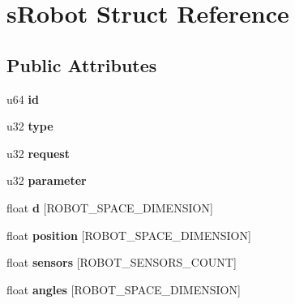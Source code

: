 \hypertarget{structsRobot}{\section{s\-Robot Struct Reference}
\label{structsRobot}
}
\subsection*{Public Attributes}
\begin{DoxyCompactItemize}
\item 
\hypertarget{structsRobot_acf6d1a5a8d9024cbe6efcd5c5b421916}{u64 {\bfseries id}}\label{structsRobot_acf6d1a5a8d9024cbe6efcd5c5b421916}

\item 
\hypertarget{structsRobot_afc0670f677fc59982378f53f3cecefe4}{u32 {\bfseries type}}\label{structsRobot_afc0670f677fc59982378f53f3cecefe4}

\item 
\hypertarget{structsRobot_ab6f3d5c45c246e0d8b46a31cf94338a3}{u32 {\bfseries request}}\label{structsRobot_ab6f3d5c45c246e0d8b46a31cf94338a3}

\item 
\hypertarget{structsRobot_ac1c416ef8f2316726f3b835fb06f2474}{u32 {\bfseries parameter}}\label{structsRobot_ac1c416ef8f2316726f3b835fb06f2474}

\item 
\hypertarget{structsRobot_adb204dd2d289ebab8178309ae815ac47}{float {\bfseries d} \mbox{[}R\-O\-B\-O\-T\-\_\-\-S\-P\-A\-C\-E\-\_\-\-D\-I\-M\-E\-N\-S\-I\-O\-N\mbox{]}}\label{structsRobot_adb204dd2d289ebab8178309ae815ac47}

\item 
\hypertarget{structsRobot_a723c6e8327be50f8f7edf5894f11fba2}{float {\bfseries position} \mbox{[}R\-O\-B\-O\-T\-\_\-\-S\-P\-A\-C\-E\-\_\-\-D\-I\-M\-E\-N\-S\-I\-O\-N\mbox{]}}\label{structsRobot_a723c6e8327be50f8f7edf5894f11fba2}

\item 
\hypertarget{structsRobot_a044ce4ac3802a9f99da743b7d85556ab}{float {\bfseries sensors} \mbox{[}R\-O\-B\-O\-T\-\_\-\-S\-E\-N\-S\-O\-R\-S\-\_\-\-C\-O\-U\-N\-T\mbox{]}}\label{structsRobot_a044ce4ac3802a9f99da743b7d85556ab}

\item 
\hypertarget{structsRobot_a7ef86a7202a493cdf4aa3ada4ba6bb73}{float {\bfseries angles} \mbox{[}R\-O\-B\-O\-T\-\_\-\-S\-P\-A\-C\-E\-\_\-\-D\-I\-M\-E\-N\-S\-I\-O\-N\mbox{]}}\label{structsRobot_a7ef86a7202a493cdf4aa3ada4ba6bb73}


\end{DoxyCompactItemize}
